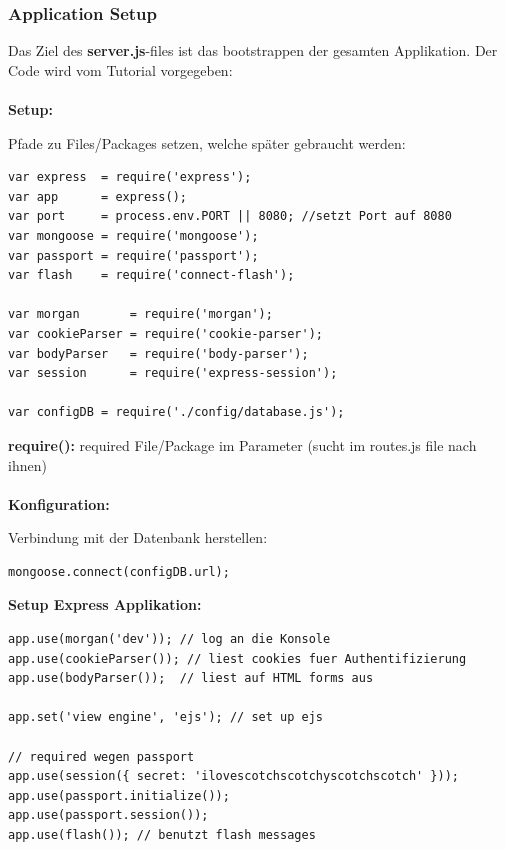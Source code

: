 \subsubsection{Application Setup}
Das Ziel des \textbf{server.js}-files ist das bootstrappen der gesamten Applikation. 
Der Code wird vom Tutorial vorgegeben:\\\\

\textbf{Setup:}

\leftskip=20pt
Pfade zu Files/Packages setzen, welche später gebraucht werden:\\

\begin{lstlisting}
var express  = require('express');
var app      = express();
var port     = process.env.PORT || 8080; //setzt Port auf 8080
var mongoose = require('mongoose');
var passport = require('passport');
var flash    = require('connect-flash');

var morgan       = require('morgan');
var cookieParser = require('cookie-parser');
var bodyParser   = require('body-parser');
var session      = require('express-session');

var configDB = require('./config/database.js');
\end{lstlisting}

\textbf{require():} required File/Package im Parameter (sucht im routes.js file nach 
ihnen)\\\\

\leftskip=0pt
\textbf{Konfiguration:}

\leftskip=20pt
Verbindung mit der Datenbank herstellen:
\begin{lstlisting}
mongoose.connect(configDB.url);
\end{lstlisting}

\leftskip=0pt
\textbf{Setup Express Applikation:}

\leftskip=20pt
\begin{lstlisting}
app.use(morgan('dev')); // log an die Konsole
app.use(cookieParser()); // liest cookies fuer Authentifizierung
app.use(bodyParser()); 	// liest auf HTML forms aus

app.set('view engine', 'ejs'); // set up ejs

// required wegen passport
app.use(session({ secret: 'ilovescotchscotchyscotchscotch' }));
app.use(passport.initialize());
app.use(passport.session()); 
app.use(flash()); // benutzt flash messages
\end{lstlisting}

